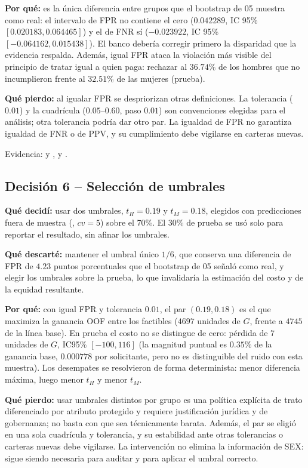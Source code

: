 \textbf{Por qué:} es la única diferencia entre grupos que el bootstrap de 05
muestra como real: el intervalo de FPR no contiene el cero
($0.042289$, IC 95\% $[0.020183,0.064465]$) y el de FNR sí
($-0.023922$, IC 95\% $[-0.064162,0.015438]$). El banco debería corregir
primero la disparidad que la evidencia respalda. Además, igual FPR ataca la
violación más visible del principio de tratar igual a quien paga: rechazar al
$36.74\%$ de los hombres que no incumplieron frente al $32.51\%$ de las
mujeres (prueba).

\textbf{Qué pierdo:} al igualar FPR se despriorizan otras definiciones. La
tolerancia ($0.01$) y la cuadrícula ($0.05$--$0.60$, paso $0.01$) son
convenciones elegidas para el análisis; otra tolerancia podría dar otro par.
La igualdad de FPR no garantiza igualdad de FNR o de PPV, y su cumplimiento
debe vigilarse en carteras nuevas.

Evidencia:  y
,
 y
.

\subsection*{Decisión 6 -- Selección de umbrales}

\textbf{Qué decidí:} usar dos umbrales, $t_H=0.19$ y $t_M=0.18$, elegidos con
predicciones fuera de muestra (, $cv=5$) sobre el
70\%. El 30\% de prueba se usó solo para reportar el resultado, sin afinar los
umbrales.

\textbf{Qué descarté:} mantener el umbral único $1/6$, que conserva una
diferencia de FPR de $4.23$ puntos porcentuales que el bootstrap de 05 señaló
como real, y elegir los umbrales sobre la prueba, lo que invalidaría la
estimación del costo y de la equidad resultante.

\textbf{Por qué:} con igual FPR y tolerancia $0.01$, el par $(0.19,0.18)$ es
el que maximiza la ganancia OOF entre los factibles ($4697$ unidades de $G$,
frente a $4745$ de la línea base). En prueba el costo no se distingue de
cero: pérdida de $7$ unidades de $G$, IC95\% $[-100,116]$ (la magnitud
puntual es $0.35\%$ de la ganancia base, $0.000778$ por solicitante, pero no
es distinguible del ruido con esta muestra). Los desempates se resolvieron de
forma determinista: menor diferencia máxima, luego menor $t_H$ y menor $t_M$.

\textbf{Qué pierdo:} usar umbrales distintos por grupo es una política
explícita de trato diferenciado por atributo protegido y requiere
justificación jurídica y de gobernanza; no basta con que sea técnicamente
barata. Además, el par se eligió en una sola cuadrícula y tolerancia, y su
estabilidad ante otras tolerancias o carteras nuevas debe vigilarse. La
intervención no elimina la información de SEX: sigue siendo necesaria para
auditar y para aplicar el umbral correcto.

